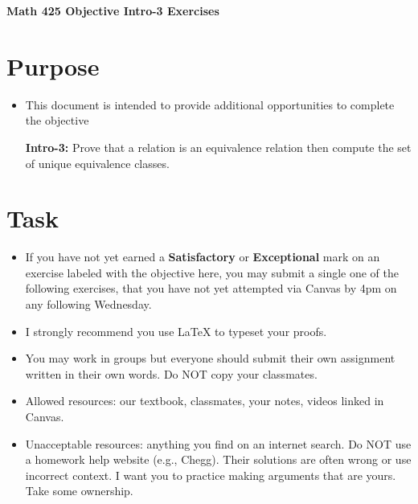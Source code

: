 \documentclass[12pt]{article}
\begin{document}
	\begin{center}
		{\Large \bf Math 425 Objective Intro-3 Exercises}
	\end{center}
	\section*{Purpose}
	\begin{itemize}
		\item This document is intended to provide additional opportunities to complete the objective
		
		\textbf{Intro-3:} Prove that a relation is an equivalence relation then compute the set of unique equivalence classes.
	\end{itemize}
	\section*{Task}
	\begin{itemize}
		\item If you have not yet earned a \textbf{Satisfactory} or \textbf{Exceptional} mark on an exercise labeled with the objective here, you may submit a single one of the following exercises, that you have not yet attempted via Canvas by 4pm on any following Wednesday.
		\item I strongly recommend you use LaTeX to typeset your proofs.
		\item You may work in groups but everyone should submit their own assignment written in their own words.  Do NOT copy your classmates.
		\item Allowed resources: our textbook, classmates, your notes, videos linked in Canvas.
		\item Unacceptable resources: anything you find on an internet search. Do NOT use a homework help website (e.g., Chegg). Their solutions are often wrong or use incorrect context.  I want you to practice making arguments that are yours. Take some ownership.
	\end{itemize}
\end{document}
